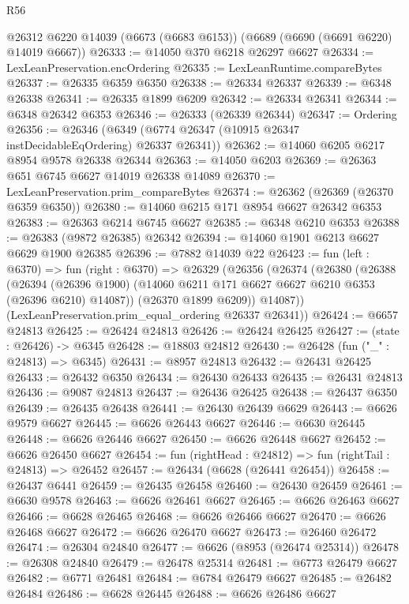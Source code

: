 \begin{lexlean}{R56}
\begin{coremodule}
    @26312
    @6220
    @14039
    (@6673 (@6683 @6153))
    (@6689 (@6690 (@6691 @6220) @14019 @6667))
@26333 := @14050 @370 @6218 @26297 @6627
@26334 := LexLeanPreservation.encOrdering
@26335 := LexLeanRuntime.compareBytes
@26337 := @26335 @6359 @6350
@26338 := @26334 @26337
@26339 := @6348 @26338
@26341 := @26335 @1899 @6209
@26342 := @26334 @26341
@26344 := @6348 @26342 @6353
@26346 := @26333 (@26339 @26344)
@26347 := Ordering
@26356 := @26346 (@6349 (@6774 @26347 (@10915 @26347 instDecidableEqOrdering) @26337 @26341))
@26362 := @14060 @6205 @6217 @8954 @9578 @26338 @26344
@26363 := @14050 @6203
@26369 := @26363 @651 @6745 @6627 @14019 @26338 @14089
@26370 := LexLeanPreservation.prim_compareBytes
@26374 := @26362 (@26369 (@26370 @6359 @6350))
@26380 := @14060 @6215 @171 @8954 @6627 @26342 @6353
@26383 := @26363 @6214 @6745 @6627
@26385 := @6348 @6210 @6353
@26388 := @26383 (@9872 @26385) @26342
@26394 := @14060 @1901 @6213 @6627 @6629 @1900 @26385
@26396 := @7882 @14039 @22
@26423 := fun (left : @6370) =>
  fun (right : @6370) =>
  @26329
    (@26356
      (@26374
        (@26380
          (@26388
            (@26394
              (@26396 @1900)
              (@14060 @6211 @171 @6627 @6627 @6210 @6353 (@26396 @6210) @14087))
            (@26370 @1899 @6209))
          @14087))
      (LexLeanPreservation.prim_equal_ordering @26337 @26341))
@26424 := @6657 @24813
@26425 := @26424 @24813
@26426 := @26424 @26425
@26427 := (state : @26426) -> @6345
@26428 := @18803 @24812
@26430 := @26428 (fun ("_" : @24813) => @6345)
@26431 := @8957 @24813
@26432 := @26431 @26425
@26433 := @26432 @6350
@26434 := @26430 @26433
@26435 := @26431 @24813
@26436 := @9087 @24813
@26437 := @26436 @26425
@26438 := @26437 @6350
@26439 := @26435 @26438
@26441 := @26430 @26439 @6629
@26443 := @6626 @9579 @6627
@26445 := @6626 @26443 @6627
@26446 := @6630 @26445
@26448 := @6626 @26446 @6627
@26450 := @6626 @26448 @6627
@26452 := @6626 @26450 @6627
@26454 := fun (rightHead : @24812) => fun (rightTail : @24813) => @26452
@26457 := @26434 (@6628 (@26441 @26454))
@26458 := @26437 @6441
@26459 := @26435 @26458
@26460 := @26430 @26459
@26461 := @6630 @9578
@26463 := @6626 @26461 @6627
@26465 := @6626 @26463 @6627
@26466 := @6628 @26465
@26468 := @6626 @26466 @6627
@26470 := @6626 @26468 @6627
@26472 := @6626 @26470 @6627
@26473 := @26460 @26472
@26474 := @26304 @24840
@26477 := @6626 (@8953 (@26474 @25314))
@26478 := @26308 @24840
@26479 := @26478 @25314
@26481 := @6773 @26479 @6627
@26482 := @6771 @26481
@26484 := @6784 @26479 @6627
@26485 := @26482 @26484
@26486 := @6628 @26445
@26488 := @6626 @26486 @6627

\end{coremodule}
\end{lexlean}
